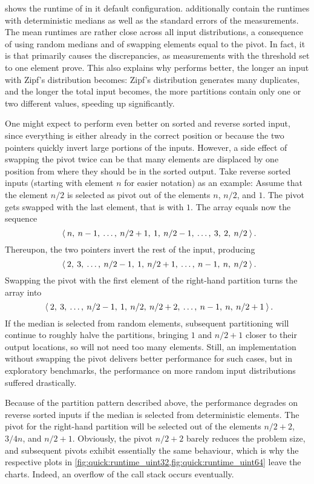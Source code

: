  shows the runtime of \QS{} in it default configuration.
 additionally contain the runtimes with deterministic medians as well as the standard errors of the measurements.
The mean runtimes are rather close across all input distributions, a consequence of using random medians and of swapping elements equal to the pivot.
In fact, it is \IS{} that primarily causes the discrepancies, as measurements with the threshold set to one element prove.
This also explains why \QS{} performs better, the longer an input with Zipf's distribution becomes:
Zipf's distribution generates many duplicates, and the longer the total input becomes, the more partitions contain only one or two different values, speeding \IS{} up significantly.

One might expect \QS{} to perform even better on sorted and reverse sorted input, since everything is either already in the correct position or because the two pointers quickly invert large portions of the inputs.
However, a side effect of swapping the pivot twice can be that many elements are displaced by one position from where they should be in the sorted output.
Take reverse sorted inputs (starting with element \(n\) for easier notation) as an example:
Assume that the element \(n/2\) is selected as pivot out of the elements \(n\), \(n/2\), and \(1\).
The pivot gets swapped with the last element, that is with \(1\).
The array equals now the sequence
\begin{equation*}
	\chevrons{\: n, \: n - 1, \: \dots, \: n/2 + 1, \: 1, \: n/2 - 1, \: \dots, \: 3, \: 2, \: n/2 \:} \mperiod
\end{equation*}
Thereupon, the two pointers invert the rest of the input, producing
\begin{equation*}
	\chevrons{\: 2, \: 3, \: \dots, \: n/2 - 1, \: 1, \: n/2 + 1, \: \dots, \: n - 1, \: n, \: n/2 \:} \mperiod
\end{equation*}
Swapping the pivot with the first element of the right-hand partition turns the array into
\begin{equation*}
	\chevrons{\: 2, \: 3, \: \dots, \: n/2 - 1, \: 1, \: n/2, \: n/2 + 2, \: \dots, \: n - 1, \: n, \: n/2 + 1 \:} \mperiod
\end{equation*}
If the median is selected from random elements, subsequent partitioning will continue to roughly halve the partitions, bringing \(1\) and \(n/2 + 1\) closer to their output locations, so \IS{} will not need too many elements.
Still, an implementation without swapping the pivot delivers better performance for such cases, but in exploratory benchmarks, the performance on more random input distributions suffered drastically.

Because of the partition pattern described above, the performance degrades on reverse sorted inputs if the median is selected from deterministic elements.
The pivot for the right-hand partition will be selected out of the elements \(n/2 + 2\), \(3/4n\), and \(n/2 + 1\).
Obviously, the pivot \(n/2 + 2\) barely reduces the problem size, and subsequent pivots exhibit essentially the same behaviour, which is why the respective plots in \cref{fig:quick:runtime_uint32,fig:quick:runtime_uint64} leave the charts.
Indeed, an overflow of the call stack occurs eventually.
